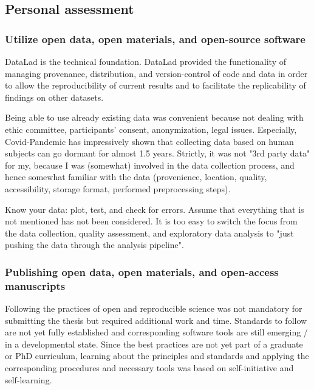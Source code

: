\subsection{Personal assessment}



\subsubsection{Utilize open data, open materials, and open-source software}


DataLad \citet{halchenko2021datalad} is the technical foundation.
%
DataLad provided the functionality of managing provenance, distribution, and
version-control of code and data in order to allow the reproducibility of
current results and to facilitate the replicability of findings on other
datasets.


%
Being able to use already existing data was convenient because not dealing with
ethic committee, participants' consent, anonymization, legal issues.
%
Especially, Covid-Pandemic has impressively shown that collecting data based on
human subjects can go dormant for almost 1.5 years.
%
Strictly, it was not "3rd party data" for my, because I was (somewhat) involved
in the data collection process, and hence somewhat familiar with the data
(provenience, location, quality, accessibility, storage format, performed
preprocessing steps).

%
Know your data: plot, test, and check for errors.
%
Assume that everything that is not mentioned has not been considered.
%
It is too easy to switch the focus from the data collection, quality assessment,
and exploratory data analysis to "just pushing the data through the analysis
pipeline".



\subsubsection{Publishing open data, open materials, and open-access
manuscripts}


%
Following the practices of open and reproducible science was not mandatory for
submitting the thesis but required additional work and time.
%
Standards to follow are not yet fully established and corresponding software
tools are still emerging / in a developmental state.
%
Since the best practices are not yet part of a graduate or PhD curriculum,
learning about the principles and standards and applying the corresponding
procedures and necessary tools was based on self-initiative and self-learning.

